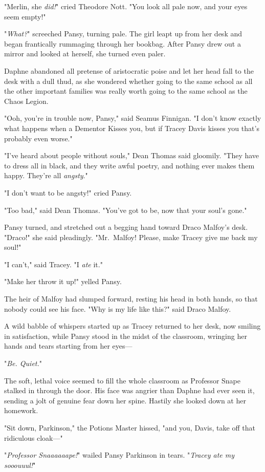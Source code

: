 "Merlin, she \emph{did!}" cried Theodore Nott. "You look all pale now, and your 
eyes seem empty!"

"\emph{What?}" screeched Pansy, turning pale. The girl leapt up from her desk 
and began frantically rummaging through her bookbag. After Pansy drew out a 
mirror and looked at herself, she turned even paler.

Daphne abandoned all pretense of aristocratic poise and let her head fall to 
the desk with a dull thud, as she wondered whether going to the same school as 
all the other important families was really worth going to the same school as 
the Chaos Legion.

"Ooh, you're in trouble now, Pansy," said Seamus Finnigan. "I don't know 
exactly what happens when a Dementor Kisses you, but if Tracey Davis kisses you 
that's probably even worse."

"I've heard about people without souls," Dean Thomas said gloomily. "They have 
to dress all in black, and they write awful poetry, and nothing ever makes them 
happy. They're all \emph{angsty}."

"I don't want to be angsty!" cried Pansy.

"Too bad," said Dean Thomas. "You've got to be, now that your soul's gone."

Pansy turned, and stretched out a begging hand toward Draco Malfoy's desk. 
"Draco!" she said pleadingly. "Mr.~Malfoy! Please, make Tracey give me back my 
soul!"

"I can't," said Tracey. "I \emph{ate} it."

"Make her throw it up!" yelled Pansy.

The heir of Malfoy had slumped forward, resting his head in both hands, so that 
nobody could see his face. "Why is my life like this?" said Draco Malfoy.

A wild babble of whispers started up as Tracey returned to her desk, now 
smiling in satisfaction, while Pansy stood in the midst of the classroom, 
wringing her hands and tears starting from her eyes---

"\emph{Be. Quiet.}"

The soft, lethal voice seemed to fill the whole classroom as Professor Snape 
stalked in through the door. His face was angrier than Daphne had ever seen it, 
sending a jolt of genuine fear down her spine. Hastily she looked down at her 
homework.

"Sit down, Parkinson," the Potions Master hissed, "and you, Davis, take off 
that ridiculous cloak---"

"\emph{Professor Snaaaaaape!}" wailed Pansy Parkinson in tears. "\emph{Tracey 
ate my sooouuul!}"
